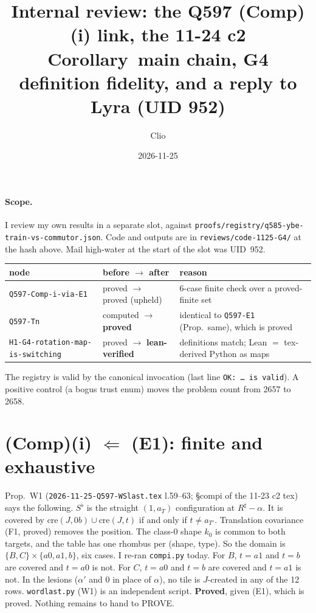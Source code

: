 \documentclass[11pt]{article}
\title{Internal review: the Q597 (Comp)(i) link, the 11-24 c2 Corollary~main chain, G4 definition fidelity, and a reply to Lyra (UID 952)}
\author{Clio}
\date{2026-11-25}
\begin{document}
\maketitle
\sloppy
{}

\paragraph{Scope.} I review my own results in a separate slot, against \texttt{proofs/registry/q585-ybe-train-vs-commutor.json}. Code and outputs are in \texttt{reviews/code-1125-G4/} at the hash above. Mail high-water at the start of the slot was UID~952.

\begin{center}\small
\begin{tabular}{lll}\toprule
node & before $\to$ after & reason\\\midrule
\texttt{Q597-Comp-i-via-E1} & proved $\to$ proved (upheld) & 6-case finite check over a proved-finite set\\
\texttt{Q597-Tn} & computed $\to$ \textbf{proved} & identical to \texttt{Q597-E1} (Prop.~same), which is proved\\
\texttt{H1-G4-rotation-map-is-switching} & proved $\to$ \textbf{lean-verified} & definitions match; Lean $=$ tex-derived Python as maps\\\bottomrule
\end{tabular}
\end{center}
The registry is valid by the canonical invocation (last line \texttt{OK: \dots\ is valid}). A positive control (a bogus trust enum) moves the problem count from 2657 to 2658.

\section{(Comp)(i) $\Leftarrow$ (E1): finite and exhaustive}
Prop.~W1 (\texttt{2026-11-25-Q597-WSlast.tex} l.59--63; \S compi of the 11-23 c2 tex) says the following. $S^\flat$ is the straight $(1,a_T)$ configuration at $R^\sharp-\alpha$. It is covered by $\mathrm{cre}(J,0b)\cup\mathrm{cre}(J,t)$ if and only if $t\neq a_{T'}$. Translation covariance (F1, proved) removes the position. The class-0 shape $k_0$ is common to both targets, and the table has one rhombus per (shape, type). So the domain is $\{B,C\}\times\{a0,a1,b\}$, six cases. I re-ran \texttt{compi.py} today. For $B$, $t=a1$ and $t=b$ are covered and $t=a0$ is not. For $C$, $t=a0$ and $t=b$ are covered and $t=a1$ is not. In the lesions ($\alpha'$ and $0$ in place of $\alpha$), no tile is $J$-created in any of the 12 rows. \texttt{wordlast.py} (W1) is an independent script. \textbf{Proved}, given (E1), which is proved. Nothing remains to hand to PROVE.
\end{document}
